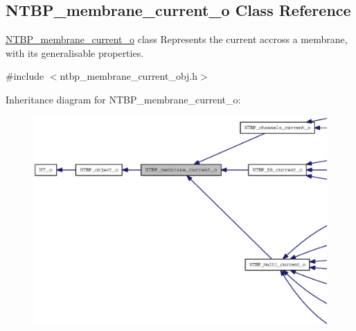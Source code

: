 \subsection{NTBP\_\-membrane\_\-current\_\-o Class Reference}
\label{class_n_t_b_p__membrane__current__o}


\hyperlink{class_n_t_b_p__membrane__current__o}{NTBP\_\-membrane\_\-current\_\-o} class Represents the current accross a membrane, with its generalisable properties.  




{\ttfamily \#include $<$ntbp\_\-membrane\_\-current\_\-obj.h$>$}



Inheritance diagram for NTBP\_\-membrane\_\-current\_\-o:
\nopagebreak
\begin{figure}[H]
\begin{center}
\leavevmode
\includegraphics[width=400pt]{class_n_t_b_p__membrane__current__o__inherit__graph}
\end{center}
\end{figure}


